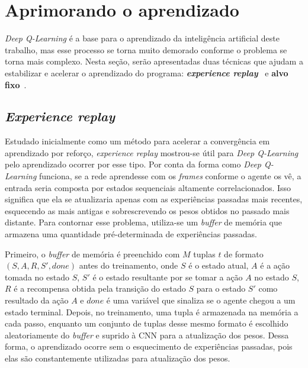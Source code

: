 
\section{Aprimorando o aprendizado}
\label{sec:enhance}

\textit{Deep Q-Learning} é a base para o aprendizado da inteligência artificial deste trabalho, mas esse processo se torna muito demorado conforme o problema se torna mais complexo.
Nesta seção, serão apresentadas duas técnicas que ajudam a estabilizar e acelerar o aprendizado do programa:
\textit{\textbf{experience replay}}~\cite{Lin1992} e \textbf{alvo fixo}~\cite{humanLevelControlDRL}.


\subsection{\textit{Experience replay}}
\label{sec:er}

Estudado inicialmente como um método para acelerar a convergência em aprendizado por reforço, \textit{experience replay} mostrou-se útil para \textit{Deep Q-Learning} pelo aprendizado ocorrer por esse tipo.
Por conta da forma como \textit{Deep Q-Learning} funciona, se a rede aprendesse com os \textit{frames} conforme o agente os vê, a entrada seria composta por estados sequenciais altamente correlacionados.
Isso significa que ela se atualizaria apenas com as experiências passadas mais recentes, esquecendo as mais antigas e sobrescrevendo os pesos obtidos no passado mais distante.
Para contornar esse problema, utiliza-se um \textit{buffer} de memória que armazena uma quantidade pré-determinada de experiências passadas.

Primeiro, o \textit{buffer} de memória é preenchido com $M$ tuplas $t$ de formato $(S, A, R, S', done)$ antes do treinamento, onde $S$ é o estado atual, $A$ é a ação tomada no estado $S$, $S'$ é o estado resultante por se tomar a ação $A$ no estado $S$, $R$ é a recompensa obtida pela transição do estado $S$ para o estado $S'$ como resultado da ação $A$ e $done$ é uma variável que sinaliza se o agente chegou a um estado terminal.
Depois, no treinamento, uma tupla é armazenada na memória a cada passo, enquanto um conjunto de tuplas desse mesmo formato é escolhido aleatoriamente do \textit{buffer} e suprido à CNN para a atualização dos pesos.
Dessa forma, o aprendizado ocorre sem o esquecimento de experiências passadas, pois elas são constantemente utilizadas para atualização dos pesos.

